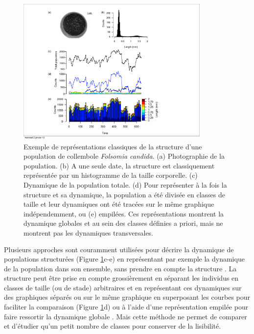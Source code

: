 \begin{figure}[!ht]
\begin{center}
\includegraphics[width=0.85\textwidth]{1_CorpsDeThese/Methodo/STdiag1}
\caption[ Représentation de la
structure d'une population]{Exemple de représentations classiques de la
structure d'une population de collembole \textit{Folsomia candida}. (a)
Photographie de la population. (b) A une seule date, la structure est
classiquement représentée par un histogramme de la taille corporelle. (c)
Dynamique de la population totale. (d) Pour représenter à la fois la structure
et sa dynamique, la population a été divisée en classes de taille et leur
dynamiques ont été tracées sur le même graphique indépendemment, ou (e)
empilées. Ces représentations montrent la dynamique globales et au sein des
classes définies a priori, mais ne montrent pas les dynamiques transversales.}
\label{fig:STd1}
\end{center}
\end{figure}

Plusieurs approches sont couramment utilisées pour décrire la dynamique de
populations structurées (Figure \ref{fig:STd1}c-e) en représentant par exemple
la dynamique de la population dans son ensemble, sans prendre en compte la
structure \autocites[Figure \ref{fig:STd1}c, ][]{schrautzer2011a}. La structure
peut être prise en compte grossièrement en séparant les individus en classes de
taille (ou de stade) arbitraires et en représentant ces dynamiques sur des
graphiques séparés \autocites{plaistow2009a} ou sur le même graphique en superposant les
courbes pour faciliter la comparaison (Figure \ref{fig:STd1}d) ou à l'aide d'une
représentation empilée pour faire ressortir la dynamique globale
\autocites[Figure \ref{fig:STd1}e,][]{madsen2000a}. Mais cette méthode ne permet
de comparer et d'étudier qu'un petit nombre de classes pour conserver de la
lisibilité. 

